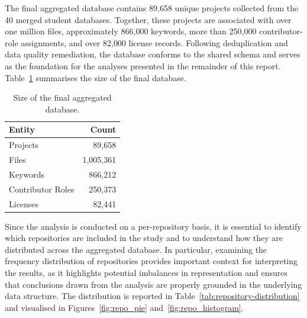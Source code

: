 The final aggregated database contains 89{,}658 unique projects collected from the 40 merged student databases. Together, these projects are associated with over one million files, approximately 866{,}000 keywords, more than 250{,}000 contributor-role assignments, and over 82{,}000 license records. Following deduplication and data quality remediation, the database conforms to the shared schema and serves as the foundation for the analyses presented in the remainder of this report. Table~\ref{tab:aggregated-dataset} summarises the size of the final database.

\begin{table}[H]
\centering
\caption{Size of the final aggregated database.}
\label{tab:aggregated-dataset}
\begin{tabular}{lr}
\toprule
\textbf{Entity} & \textbf{Count} \\
\midrule
Projects            & 89{,}658 \\
Files               & 1{,}005{,}361 \\
Keywords            & 866{,}212 \\
Contributor Roles   & 250{,}373 \\
Licenses            & 82{,}441 \\
\bottomrule
\end{tabular}
\end{table}

Since the analysis is conducted on a per-repository basis, it is essential to identify which repositories are included in the study and to understand how they are distributed across the aggregated database. In particular, examining the frequency distribution of repositories provides important context for interpreting the results, as it highlights potential imbalances in representation and ensures that conclusions drawn from the analysis are properly grounded in the underlying data structure. The distribution is reported in Table~\ref{tab:repository-distribution} and visualised in Figures~\ref{fig:repo_pie} and~\ref{fig:repo_histogram}.

